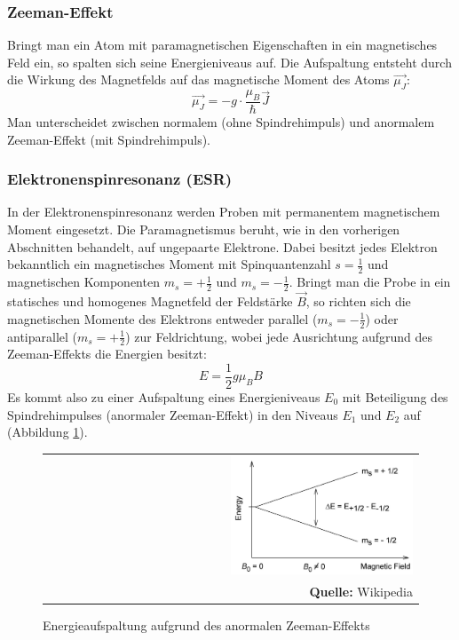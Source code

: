 \documentclass[a4paper,titlepage]{scrartcl}
\numberwithin{equation}{section}
\begin{document}
\subsubsection{Zeeman-Effekt \cite{wiki:zeeman}}
Bringt man ein Atom mit paramagnetischen Eigenschaften in ein magnetisches Feld ein, so spalten sich seine Energieniveaus auf. Die Aufspaltung entsteht durch die Wirkung des Magnetfelds auf das magnetische Moment des Atoms $\vec{\mu_J}$:
\begin{equation*}
\vec{\mu_J}=-g \cdot \frac{\mu_B}{\hbar} \vec{J}
\end{equation*}
Man unterscheidet zwischen normalem (ohne Spindrehimpuls) und anormalem Zeeman-Effekt (mit Spindrehimpuls).
\subsubsection{Elektronenspinresonanz (ESR)}
In der Elektronenspinresonanz werden Proben mit permanentem magnetischem Moment eingesetzt. Die Paramagnetismus beruht, wie in den vorherigen Abschnitten behandelt, auf ungepaarte Elektrone. Dabei besitzt jedes Elektron bekanntlich ein magnetisches Moment mit Spinquantenzahl $s=\frac{1}{2}$ und magnetischen Komponenten $m_s=+ \frac{1}{2}$ und $m_s=-\frac{1}{2}$. Bringt man die Probe in ein statisches und homogenes Magnetfeld der Feldstärke $\vec{B}$, so richten sich die magnetischen Momente des Elektrons entweder parallel ($m_s=-\frac{1}{2}$) oder antiparallel ($m_s=+\frac{1}{2}$) zur Feldrichtung, wobei jede Ausrichtung aufgrund des Zeeman-Effekts die Energien besitzt:
\begin{equation*}
E=\frac{1}{2}g\mu_B B
\end{equation*}
Es kommt also zu einer Aufspaltung eines Energieniveaus $E_0$ mit Beteiligung des Spindrehimpulses (anormaler Zeeman-Effekt) in den Niveaus $E_1$ und $E_2$ auf (Abbildung \ref{fig:aufspaltung}).
\begin{figure}[H]
	\centering
	\begin{tabular}{@{}r@{}}
		\includegraphics[width=0.5\textwidth]{images/EPR_splitting.jpg}\\
		\footnotesize\sffamily\textbf{Quelle:} Wikipedia \cite{wiki:epr}
	\end{tabular}
	\caption{Energieaufspaltung aufgrund des anormalen Zeeman-Effekts}
    \label{fig:aufspaltung}
\end{figure}
\end{document}
